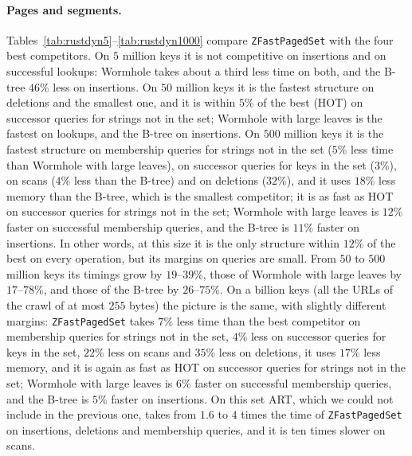 \documentclass[a4paper]{article}
\newcommand{\?}{\mskip1.5mu}
\begin{document}
\paragraph{Pages and segments.} Tables~\ref{tab:rustdyn5}--\ref{tab:rustdyn1000} compare \texttt{ZFastPagedSet} with the four best competitors. 
On $5$ million keys it is not competitive on insertions and on successful lookups: Wormhole takes about a third less time on both, and the B-tree $46$\% less on insertions. 
On $50$ million keys it is the fastest structure on deletions and the smallest one, and it is within $5$\% of the best (HOT) on successor queries for strings not in the set;
Wormhole with large leaves is the fastest on lookups, and the B-tree on insertions. 
On $500$ million keys it is the fastest structure on membership queries for strings not in the set ($5$\% less time than Wormhole with large leaves), 
on successor queries for keys in the set ($3$\%), on scans ($4$\% less than the B-tree) and on deletions ($32$\%), and it uses $18$\% less memory than the B-tree, 
which is the smallest competitor; it is as fast as HOT on successor queries for strings not in the set; Wormhole with large leaves is $12$\% faster on successful membership queries, 
and the B-tree is $11$\% faster on insertions. 
In other words, at this size it is the only structure within $12$\% of the best on every operation, but its margins on queries are small. 
From $50$ to $500$ million keys its timings grow by $19$--$39$\%, those of Wormhole with large leaves by $17$--$78$\%, and those of the B-tree by $26$--$75$\%.
On a billion keys (all the URLs of the crawl of at most $255$ bytes) the picture is the same, with slightly different margins: 
\texttt{ZFastPagedSet} takes $7$\% less time than the best competitor on membership queries for strings not in the set, $4$\% less on successor queries for keys in the set, 
$22$\% less on scans and $35$\% less on deletions, it uses $17$\% less memory, and it is again as fast as HOT on successor queries for strings not in the set; 
Wormhole with large leaves is $6$\% faster on successful membership queries, and the B-tree is $5$\% faster on insertions. 
On this set ART, which we could not include in the previous one, takes from $1.6$ to $4$ times the time of \texttt{ZFastPagedSet} on insertions, deletions and membership queries, and it is ten times slower on scans.
\end{document}
